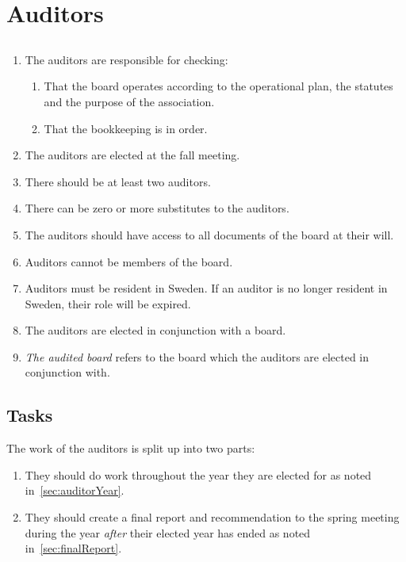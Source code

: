 \section*{Auditors}
\subsection{}
\begin{enumerate}
  \item The auditors are responsible for checking: 
  \begin{enumerate}
    \item That the board operates according to the operational plan, the statutes and the purpose of the association.
    \item That the bookkeeping is in order.
  \end{enumerate}
  \item The auditors are elected at the fall meeting. 
  \item There should be at least two auditors. 
  \item There can be zero or more substitutes to the auditors.
  \item The auditors should have access to all documents of the board at their will.
  \item Auditors cannot be members of the board. 
  \item Auditors must be resident in Sweden. If an auditor is no longer resident in Sweden, their role will be expired.
  \item The auditors are elected in conjunction with a board.
  \item \textit{The audited board} refers to the board which the auditors are elected in conjunction with.
\end{enumerate}

\subsection{Tasks}
The work of the auditors is split up into two parts:
\begin{enumerate}
  \item They should do work throughout the year they are elected for as noted in~\ref{sec:auditorYear}.
  \item They should create a final report and recommendation to the spring meeting during the year \textit{after} their elected year has ended as noted in~\ref{sec:finalReport}.
\end{enumerate}

